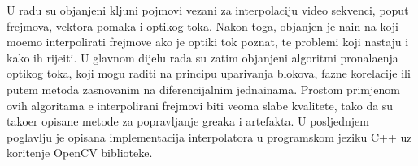 U radu su obja\sh njeni klju\ch ni pojmovi vezani za interpolaciju video sekvenci, poput frejmova, vektora pomaka i opti\ch kog toka. Nakon toga,
obja\sh njen je na\ch in na koji mo\zh emo interpolirati frejmove ako je opti\ch ki tok poznat, te problemi koji nastaju i kako ih rije\sh iti. U glavnom dijelu rada su zatim
obja\sh njeni algoritmi pronala\zh enja opti\ch kog toka, koji mogu raditi na principu uparivanja blokova, fazne korelacije ili putem metoda zasnovanim na diferencijalnim
jedna\ch inama. Prostom primjenom ovih algoritama \cj e interpolirani frejmovi biti veoma slabe kvalitete, tako da su tako\dj er opisane metode za popravljanje gre\sh aka
i artefakta. U posljednjem poglavlju je opisana implementacija interpolatora u programskom jeziku C++ uz kori\sh tenje OpenCV biblioteke.